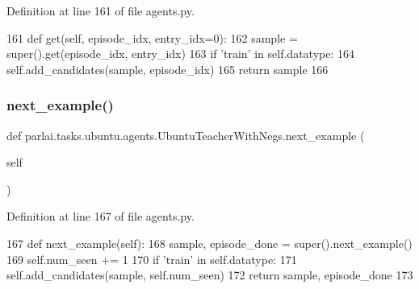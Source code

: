 Definition at line 161 of file agents.\+py.


\begin{DoxyCode}
161     \textcolor{keyword}{def }get(self, episode\_idx, entry\_idx=0):
162         sample = super().get(episode\_idx, entry\_idx)
163         \textcolor{keywordflow}{if} \textcolor{stringliteral}{'train'} \textcolor{keywordflow}{in} self.datatype:
164             self.add\_candidates(sample, episode\_idx)
165         \textcolor{keywordflow}{return} sample
166 
\end{DoxyCode}
\mbox{\label{classparlai_1_1tasks_1_1ubuntu_1_1agents_1_1UbuntuTeacherWithNegs_aef77d69155c1215eb64ec5c1ba895bdf}} 
\subsubsection{\texorpdfstring{next\+\_\+example()}{next\_example()}}
{\footnotesize\ttfamily def parlai.\+tasks.\+ubuntu.\+agents.\+Ubuntu\+Teacher\+With\+Negs.\+next\+\_\+example (\begin{DoxyParamCaption}\item[{}]{self }\end{DoxyParamCaption})}



Definition at line 167 of file agents.\+py.


\begin{DoxyCode}
167     \textcolor{keyword}{def }next\_example(self):
168         sample, episode\_done = super().next\_example()
169         self.num\_seen += 1
170         \textcolor{keywordflow}{if} \textcolor{stringliteral}{'train'} \textcolor{keywordflow}{in} self.datatype:
171             self.add\_candidates(sample, self.num\_seen)
172         \textcolor{keywordflow}{return} sample, episode\_done
173 
\end{DoxyCode}
\mbox{\label{classparlai_1_1tasks_1_1ubuntu_1_1agents_1_1UbuntuTeacherWithNegs_aacac8ac1f8b79287b943b85ed21b081b}} 
